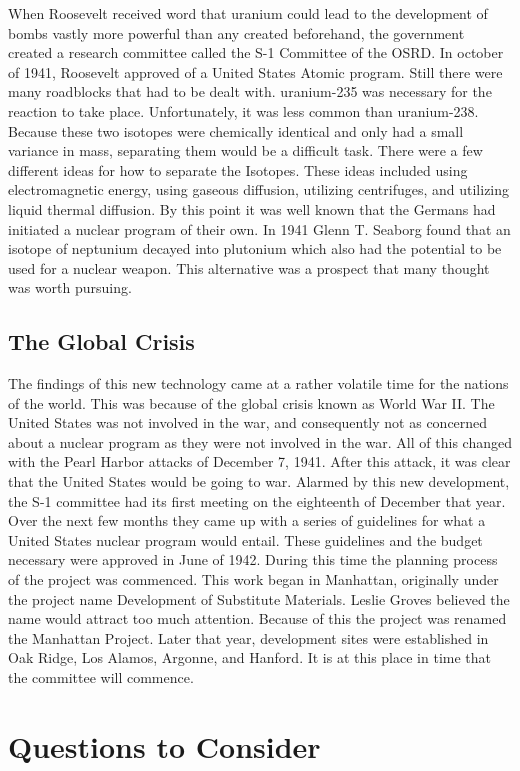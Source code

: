 \documentclass[11 pt, twoside]{article}
\begin{document}
	 When Roosevelt received word that uranium could lead to the development of bombs vastly more powerful than any created beforehand, the government created a research committee called the S-1 Committee of the OSRD. In october of 1941, Roosevelt approved of a United States Atomic program.
	 Still there were many roadblocks that had to be dealt with. uranium-235 was necessary for the reaction to take place. Unfortunately, it was less common than uranium-238. Because these two isotopes were chemically identical and only had a small variance in mass, separating them would be a difficult task. There were a few different ideas for how to separate the Isotopes. These ideas included using electromagnetic energy, using gaseous diffusion, utilizing centrifuges, and utilizing liquid thermal diffusion. By this point it was well known that the Germans had initiated a nuclear program of their own.
	 In 1941 Glenn T. Seaborg found that an isotope of neptunium decayed into plutonium which also had the potential to be used for a nuclear weapon. This alternative was a prospect that many thought was worth pursuing. 
\subsection{The Global Crisis}
The findings of this new technology came at a rather volatile time for the nations of the world. This was because of the global crisis known as World War II. The United States was not involved in the war, and consequently not as concerned about a nuclear program as they were not involved in the war. All of this changed with the Pearl Harbor attacks of December 7, 1941. After this attack, it was clear that the United States would be going to war. Alarmed by this new development, the S-1 committee had its first meeting on the eighteenth of December that year. Over the next few months they came up with a series of guidelines for what a United States nuclear program would entail. These guidelines and the budget necessary were approved in June of 1942. During this time the planning process of the project was commenced. This work began in Manhattan, originally under the project name Development of Substitute Materials. Leslie Groves believed the name would attract too much attention. Because of this the project was renamed the Manhattan Project. Later that year, development sites were established in Oak Ridge, Los Alamos, Argonne, and Hanford. It is at this place in time that the committee will commence. 

\section{Questions to Consider}
\end{document}
